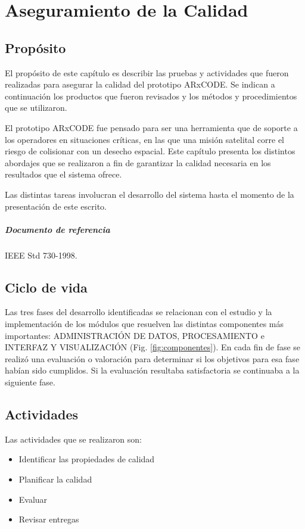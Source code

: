 \chapter{Aseguramiento de la Calidad}
\label{chap:qa}

\section{Prop\'osito}
El prop\'osito de este cap\'itulo es describir las pruebas y actividades que fueron realizadas para asegurar la calidad del prototipo ARxCODE. 
Se indican a continuaci\'on los productos que fueron revisados y los m\'etodos y procedimientos que se utilizaron.

El prototipo ARxCODE fue pensado para ser una herramienta que de soporte a los operadores en situaciones cr\'iticas, en las que una misi\'on satelital corre el riesgo de colisionar con un desecho espacial. Este cap\'itulo presenta los distintos abordajes que se realizaron a fin de garantizar la calidad necesaria en los resultados que el sistema ofrece.

Las distintas tareas involucran el desarrollo del sistema hasta el momento de la presentaci\'on de este escrito.

\paragraph{Documento de referencia} IEEE Std 730-1998.

\section{Ciclo de vida}
Las tres fases del desarrollo identificadas se relacionan con el estudio y la implementaci\'on de los m\'odulos que resuelven las distintas componentes m\'as importantes: ADMINISTRACI\'ON DE DATOS, PROCESAMIENTO e INTERFAZ Y VISUALIZACI\'ON (Fig. \ref{fig:componentes}). En cada fin de fase se realiz\'o una evaluaci\'on o valoraci\'on para determinar si los objetivos para esa fase hab\'ian sido cumplidos. Si la evaluaci\'on resultaba satisfactoria se continuaba a la siguiente fase.
\section{Actividades}
Las actividades que se realizaron son:
\begin{itemize}
 \item Identificar las propiedades de calidad
 \item Planificar la calidad
 \item Evaluar
 \item Revisar entregas
\end{itemize}


